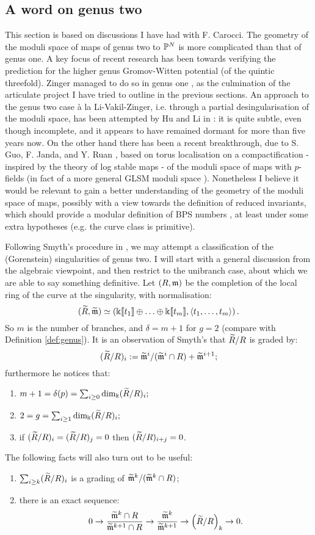 \subsection{A word on genus two}

This section is based on discussions I have had with F. Carocci. The geometry of the moduli space of maps of genus two to $\mathbb P^N$ is more complicated than that of genus one. A key focus of recent research has been towards verifying the \cite{BCOV} prediction for the higher genus Gromov-Witten potential (of the quintic threefold). Zinger managed to do so in genus one \cite{Zinger-CYhyp}, as the culmination of the articulate project I have tried to outline in the previous sections. An approach to the genus two case \`a la Li-Vakil-Zinger, i.e. through a partial desingularisation of the moduli space, has been attempted by Hu and Li in \cite{HL2}: it is quite subtle, even though incomplete, and it appears to have remained dormant for more than five years now. On the other hand there has been a recent breakthrough, due to S. Guo, F. Janda, and Y. Ruan \cite{GJR}, based on torus localisation on a compactification - inspired by the theory of log stable maps - of the moduli space of maps with $p$-fields (in fact of a more general GLSM moduli space \cite{CJRS}). Nonetheless I believe it would be relevant to gain a better understanding of the geometry of the moduli space of maps, possibly with a view towards the definition of reduced invariants, which should provide a modular definition of BPS numbers \cite{PandhaHodge}, at least under some extra hypotheses (e.g. the curve class is primitive).

Following Smyth's procedure in \cite[Appendix A]{SMY1}, we may attempt a classification of the (Gorenstein) singularities of genus two. I will start with a general discussion from the algebraic viewpoint, and then restrict to the unibranch case, about which we are able to say something definitive. Let $(R,\mathfrak m)$ be the completion of the local ring of the curve at the singularity, with normalisation:
\[(\widetilde{R},\widetilde{\mathfrak m})\simeq\left(\Bbbk[\![t_1]\!]\oplus\ldots\oplus\Bbbk[\![t_m]\!],\langle t_1,\ldots,t_m\rangle\right).\]
So $m$ is the number of branches, and $\delta=m+1$ for $g=2$ (compare with Definition \ref{def:genus}). It is an observation of Smyth's that $\widetilde{R}/R$ is graded by:
\[ (\widetilde{R}/R)_i:=\widetilde{\mathfrak m}^i/(\widetilde{\mathfrak m}^i\cap R)+\widetilde{\mathfrak m}^{i+1};\]
furthermore he notices that:
\begin{enumerate}
\item $m+1=\delta(p)=\sum_{i\geq 0}\dim_\Bbbk(\widetilde{R}/R)_i;$
\item $2=g=\sum_{i\geq 1}\dim_\Bbbk(\widetilde{R}/R)_i;$
\item if $(\widetilde{R}/R)_i=(\widetilde{R}/R)_j=0$ then $(\widetilde{R}/R)_{i+j}=0$.
\end{enumerate}
The following facts will also turn out to be useful:
\begin{enumerate}[resume]
 \item $\sum_{i\geq k}(\widetilde{R}/R)_i$ is a grading of $\widetilde{\mathfrak m}^k/(\widetilde{\mathfrak m}^k\cap R)$;
 \item there is an exact sequence:
 \[ 0\rightarrow \frac{\widetilde{\mathfrak m}^k\cap R}{\widetilde{\mathfrak m}^{k+1}\cap R}\rightarrow \frac{\widetilde{\mathfrak m}^k}{\widetilde{\mathfrak m}^{k+1}}\rightarrow \left(\widetilde{R}/R\right)_k\rightarrow 0.\]
\end{enumerate}

